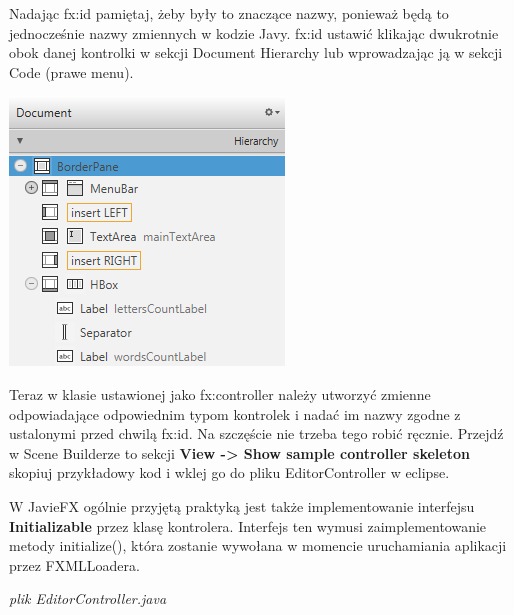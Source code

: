 \documentclass[letterpaper,10pt,english]{sphinxmanual}
\begin{document}
Nadając fx:id pamiętaj, żeby były to znaczące nazwy, ponieważ będą to jednocześnie nazwy zmiennych w kodzie Javy. fx:id ustawić klikając dwukrotnie obok danej kontrolki w sekcji Document Hierarchy lub wprowadzając ją w sekcji Code (prawe menu).

{\hfill\includegraphics{fxid2.png}\hfill}

Teraz w klasie ustawionej jako fx:controller należy utworzyć zmienne odpowiadające odpowiednim typom kontrolek i nadać im nazwy zgodne z ustalonymi przed chwilą fx:id. Na szczęście nie trzeba tego robić ręcznie. Przejdź w Scene Builderze to sekcji \textbf{View -\textgreater{} Show sample controller skeleton} skopiuj przykładowy kod i wklej go do pliku EditorController w eclipse.

W JavieFX ogólnie przyjętą praktyką jest także implementowanie interfejsu \textbf{Initializable} przez klasę kontrolera. Interfejs ten wymusi zaimplementowanie metody initialize(), która zostanie wywołana w momencie uruchamiania aplikacji przez FXMLLoadera.

\emph{plik EditorController.java}
\end{document}
